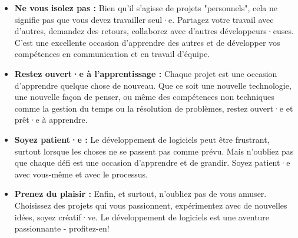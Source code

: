 \begin{itemize}
    \item \textbf{Ne vous isolez pas :} Bien qu'il s'agisse de projets "personnels", cela ne signifie pas que vous devez travailler seul·e. Partagez votre travail avec d'autres, demandez des retours, collaborez avec d'autres développeurs·euses. C'est une excellente occasion d'apprendre des autres et de développer vos compétences en communication et en travail d'équipe.

    \item \textbf{Restez ouvert·e à l'apprentissage :} Chaque projet est une occasion d'apprendre quelque chose de nouveau. Que ce soit une nouvelle technologie, une nouvelle façon de penser, ou même des compétences non techniques comme la gestion du temps ou la résolution de problèmes, restez ouvert·e et prêt·e à apprendre.

    \item \textbf{Soyez patient·e :} Le développement de logiciels peut être frustrant, surtout lorsque les choses ne se passent pas comme prévu. Mais n'oubliez pas que chaque défi est une occasion d'apprendre et de grandir. Soyez patient·e avec vous-même et avec le processus.

    \item \textbf{Prenez du plaisir :} Enfin, et surtout, n'oubliez pas de vous amuser. Choisissez des projets qui vous passionnent, expérimentez avec de nouvelles idées, soyez créatif·ve. Le développement de logiciels est une aventure passionnante - profitez-en!
\end{itemize}